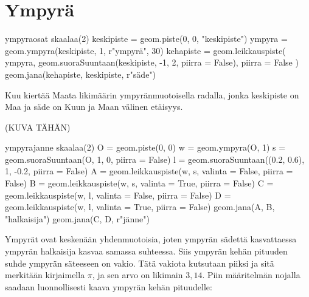 \section*{Ympyrä}

\begin{luoKuva}{ympyraosat}
	skaalaa(2)
	keskipiste = geom.piste(0, 0, "keskipiste")
	ympyra = geom.ympyra(keskipiste, 1, r"ympyr\"{a}", 30)
	kehapiste = geom.leikkauspiste(
		ympyra, geom.suoraSuuntaan(keskipiste, -1, 2, piirra = False), piirra = False
	)
	geom.jana(kehapiste, keskipiste, r"s\"{a}de")
\end{luoKuva}
\begin{center}
\end{center}

\begin{esimerkki} %
Kuu kiertää Maata likimäärin ympyränmuotoisella radalla, jonka keskipiste on Maa ja säde on Kuun ja Maan välinen etäisyys.
\end{esimerkki}

(KUVA TÄHÄN)

\begin{luoKuva}{ympyrajanne}
	skaalaa(2)
	O = geom.piste(0, 0)
	w = geom.ympyra(O, 1)
	s = geom.suoraSuuntaan(O, 1, 0, piirra = False)
	l = geom.suoraSuuntaan((0.2, 0.6), 1, -0.2, piirra = False)
	A = geom.leikkauspiste(w, s, valinta = False, piirra = False)
	B = geom.leikkauspiste(w, s, valinta = True, piirra = False)
	C = geom.leikkauspiste(w, l, valinta = False, piirra = False)
	D = geom.leikkauspiste(w, l, valinta = True, piirra = False)
	geom.jana(A, B, "halkaisija")
	geom.jana(C, D, r"j\"{a}nne")
\end{luoKuva}


\begin{center}
\end{center}

Ympyrät ovat keskenään yhdenmuotoisia, joten ympyrän sädettä kasvattaessa ympyrän halkaisija kasvaa samassa suhteessa. Siis ympyrän kehän pituuden suhde ympyrän säteeseen on vakio. Tätä vakiota kutsutaan piiksi ja sitä merkitään kirjaimella $\pi$, ja sen arvo on likimain $3,14$. Piin määritelmän nojalla saadaan luonnollisesti kaava ympyrän kehän pituudelle:

